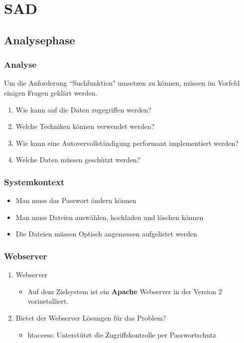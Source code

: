 \section{SAD}
\subsection{Analysephase}
\begin{frame} 
  \frametitle{Analyse} 
  Um die Anforderung ``Suchfunktion" umsetzen zu können, müssen im Vorfeld einigen Fragen geklärt werden. 
   \begin{enumerate}
   \item Wie kann auf die Daten zugegriffen werden?
   \item Welche Techniken können verwendet werden?
   \item Wie kann eine Autovervollständigung performant implementiert werden?
   \item Welche Daten müssen geschützt werden?
  \end{enumerate}
\end{frame}

\begin{frame} 
  \frametitle{Systemkontext}
  
   \begin{itemize}
    \item Man muss das Passwort ändern können
    \item Man muss Dateien auswählen, hochladen und löschen können
    \item Die Dateien müssen Optisch angemessen aufgelistet werden
   \end{itemize}

\end{frame}

\begin{frame} %
  \frametitle{Webserver} %
  \begin{enumerate}
   \item Webserver
   \begin{itemize}
    \item Auf dem Zielsystem ist ein \textbf{Apache} Webserver in der Version 2 vorinstalliert.
   \end{itemize}

   \item Bietet der Webserver Lösungen für das Problem?
   \begin{itemize}
    \item htaccess: Unterstützt die Zugriffskontrolle per Passwortschutz
   \end{itemize}

  \end{enumerate}


\end{frame}

